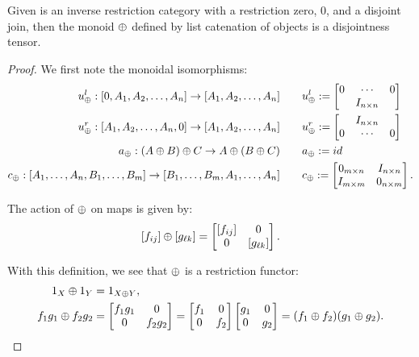 \begin{lemma}\label{lem:imat_is_disjoint_tensor_category}
  Given \X is an inverse restriction category with a restriction zero, $0$, and a disjoint join,
  then the monoid $\oplus$ defined by list catenation of objects is a disjointness tensor.
\end{lemma}
\begin{proof}
  We first note the monoidal isomorphisms:
  \begin{align*}
    u_{\oplus}^l : [0,A_1,A_2,\ldots,A_n] \to [A_1,A_2,\ldots,A_n] \qquad& u_{\oplus}^l :=
    \begin{bmatrix}
      0&\cdots&0 \\
      & I_{n\times n}
    \end{bmatrix}\\
    u_{\oplus}^r : [A_1,A_2,\ldots,A_n,0] \to [A_1,A_2,\ldots,A_n] \qquad & u_{\oplus}^r :=
    \begin{bmatrix}
      & I_{n\times n} \\
      0&\cdots&0
    \end{bmatrix} \\
    a_{\oplus} : (A\oplus B)\oplus C \to A\oplus (B\oplus C) \qquad &a_{\oplus} := id \\
    c_{\oplus} : [A_1,\ldots,A_n,B_1,\ldots,B_m] \to [B_1,\ldots,B_m,A_1,\ldots,A_n]  \qquad &
      c_{\oplus} := \begin{bmatrix}
                      0_{m\times n} & I_{n\times n} \\
                      I_{m\times m} & 0_{n\times m}
                \end{bmatrix}.
  \end{align*}

  The action of $\oplus$ on maps is given by:
  \[
    [f_{ij}]\oplus [g_{\ell k}] = \begin{bmatrix}
      [f_{ij}] & 0 \\
      0 & [g_{\ell k}]
      \end{bmatrix}.
  \]

  With this definition, we see that $\oplus$ is a restriction functor:
  \begin{align*}
    1_X \oplus 1_Y &= 1_{X\oplus Y}, \\
    f_1 g_1 \oplus f_2 g_2 &=
    \begin{bmatrix}
      f_1 g_1 & 0 \\ 0 & f_2 g_2
    \end{bmatrix} =
    \begin{bmatrix}
      f_1 & 0 \\ 0 & f_2
    \end{bmatrix}
    \begin{bmatrix}
      g_1 & 0 \\ 0 & g_2
    \end{bmatrix} = (f_1 \oplus f_2) (g_1 \oplus g_2).
  \end{align*}


\end{proof}
